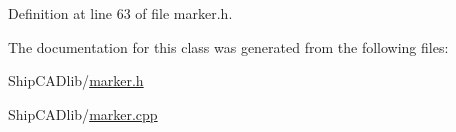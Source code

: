 Definition at line 63 of file marker.\-h.



The documentation for this class was generated from the following files\-:\begin{DoxyCompactItemize}
\item 
Ship\-C\-A\-Dlib/\hyperlink{marker_8h}{marker.\-h}\item 
Ship\-C\-A\-Dlib/\hyperlink{marker_8cpp}{marker.\-cpp}\end{DoxyCompactItemize}
